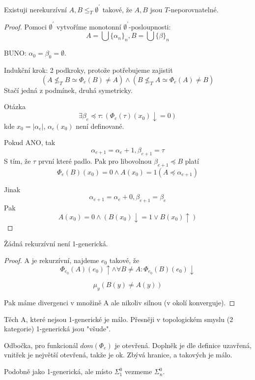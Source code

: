 \begin{theorem}
	Existuji nerekurzívní $A, B \leq_T \emptyset^{\prime}$ takové, že $A, B$ jsou $T$-neporovnatelné.
\end{theorem}
\begin{proof}
	Pomoci $\emptyset^{\prime}$ vytvoříme monotonní $\emptyset^{\prime}$-posloupnosti:
	\[ A = \bigcup \{\alpha_n\}_n, B = \bigcup \{\beta\}_n \]

	BUNO: $\alpha_0 = \beta_0 = \emptyset$.

	Indukční krok: 2 podkroky, protože potřebujeme zajistit
	\[ (A \nleq_T B \simeq \Phi_e(B) \neq A) \land (B \nleq_T A \simeq \Phi_e(A) \neq B) \]
	Stačí jedná z podmínek, druhá symetricky.

	Otázka
	\[ \exists \beta_e \preccurlyeq \tau: (\Phi_e(\tau)(x_0)\downarrow = 0) \]
	kde $x_0 = |\alpha_e|$, $\alpha_e(x_0)$ není definované.

	Pokud ANO, tak
	\[ \alpha_{e + 1} = \alpha_e + 1, \beta_{e + 1} = \tau \]
	S tím, že $\tau$ první které padlo.
	Pak pro libovolnou $\beta_{e + 1} \preccurlyeq B$ platí
	\[ \Phi_e(B)(x_0) = 0 \land A(x_0) = 1 (A \preccurlyeq \alpha_{e + 1})\]

	Jinak
	\[ \alpha_{e + 1} = \alpha_e + 0, \beta_{e + 1} = \beta_e \]
	Pak
	\[ A(x_0) = 0 \land (B(x_0) \downarrow = 1 \lor B(x_0) \uparrow) \]
\end{proof}

\begin{theorem}[R.S. a 1-generické]
	Žádná rekurzívní není 1-generická.
\end{theorem}
\begin{proof}
	A je rekurzívní, najdeme $e_0$ takové, že
	\[ \Phi_{e_0}(A)(e_0) \uparrow \land \forall B \neq A: \Phi_{e_0}(B)(e_0) \downarrow \]

	\[ \mu_y (B(y) \neq A(y)) \]

	Pak máme divergenci v množině A ale nikoliv silnou (v okolí konverguje).
\end{proof}

\begin{note}
	Těch A, které nejsou 1-generické je málo.
	Přesněji v topologickém smyslu (2 kategorie) 1-generická jsou "všude".

	Odbočka, pro funkcionál $dom(\Phi_e)$ je otevřená.
	Doplněk je dle definice uzavřená, vnitřek je největší otevřená, takže je ok.
	Zbývá hranice, a takových je málo.
\end{note}

\begin{definition}[n-generická]
	Podobně jako 1-generická, ale místo $\Sigma_1^0$ vezmeme $\Sigma_n^0$.
\end{definition}

